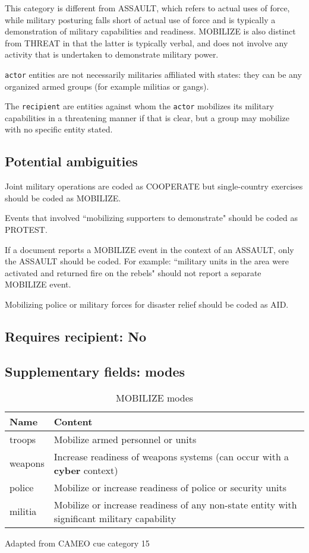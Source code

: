 \documentclass[11pt]{report}
\newcommand{\plcat}[1]{\textsf{#1}}
\newcommand{\plcon}[1]{\textbf{#1}}
\newcommand{\txt}[1]{\texttt{#1}}
\begin{document}
This category is different from \plcat{ASSAULT}, which refers to actual uses of force, while military posturing falls short of actual use of force and is typically a demonstration of military capabilities and readiness. \plcat{MOBILIZE} is also distinct from \plcat{THREAT} in that the latter is typically verbal, and does not involve any activity that is undertaken to demonstrate military power. 

\txt{actor} entities  are not necessarily militaries affiliated with states: they can be any organized armed groups (for example militias or gangs). 

The \txt{recipient} are entities against whom the \txt{actor} mobilizes its military capabilities in a threatening manner if that is clear, but a group may mobilize with no specific entity stated.

\subsection{Potential ambiguities}

Joint military operations are coded as \plcat{COOPERATE} but single-country exercises should be coded as \plcat{MOBILIZE}.

Events that involved ``mobilizing supporters to demonstrate" should be coded as \plcat{PROTEST}.

If a document reports a \plcat{MOBILIZE} event in the context of an \plcat{ASSAULT}, only the \plcat{ASSAULT} should be coded. For example: ``military units in the area were activated and returned fire on the rebels" should not report a separate \plcat{MOBILIZE} event.

Mobilizing police or military forces for disaster relief should be coded as \plcat{AID}.

\subsection{Requires recipient: No}

\subsection{Supplementary fields: modes }

\begin{table}[htp]
\caption{MOBILIZE modes}
\begin{center}
\begin{tabular}{|l|p{13cm}|}
\hline
Name & Content \\
\hline
troops & Mobilize armed personnel or units\\
weapons & Increase readiness of weapons systems (can occur with a \plcon{cyber} context) \\
police & Mobilize or increase readiness of police or security units\\
militia & Mobilize or increase readiness of any non-state entity with significant military capability\\
\hline
\end{tabular}
\end{center}
\label{tab:mobilizemode}
Adapted from CAMEO cue category 15
\end{table}
\end{document}
